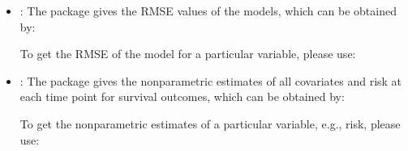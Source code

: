 \documentclass[letterpaper,10pt,english]{sphinxmanual}
\begin{document}
\begin{itemize}
\item {} 
\sphinxAtStartPar
{}: The package gives the RMSE values of the models, which can be obtained by:
\begin{quote}

\begin{sphinxVerbatim}[commandchars=\\\{\}]
  \PYG{p}{[}\PYG{p}{]}
\end{sphinxVerbatim}
\end{quote}

\sphinxAtStartPar
To get the RMSE of the model for a particular variable, please use:
\begin{quote}

\begin{sphinxVerbatim}[commandchars=\\\{\}]
  \PYG{p}{[}\PYG{p}{]}\PYG{p}{[}\PYG{p}{]}
\end{sphinxVerbatim}
\end{quote}

\item {} 
\sphinxAtStartPar
{}: The package gives the nonparametric estimates of all covariates and risk at each time point for survival outcomes, which can be obtained by:
\begin{quote}

\begin{sphinxVerbatim}[commandchars=\\\{\}]
  \PYG{p}{[}\PYG{p}{]}
\end{sphinxVerbatim}
\end{quote}

\sphinxAtStartPar
To get the nonparametric estimates of a particular variable, e.g., risk, please use:
\begin{quote}

\begin{sphinxVerbatim}[commandchars=\\\{\}]
  \PYG{p}{[}\PYG{p}{]}\PYG{p}{[}\PYG{p}{]}
\end{sphinxVerbatim}
\end{quote}


\end{itemize}
\end{document}
